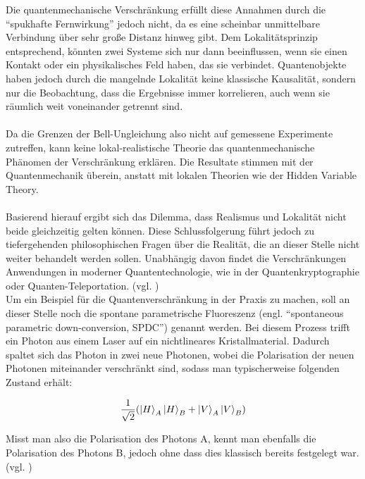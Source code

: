 Die quantenmechanische Verschränkung erfüllt diese Annahmen durch die ``spukhafte Fernwirkung'' jedoch nicht, da es eine scheinbar unmittelbare Verbindung über sehr große Distanz hinweg gibt. Dem Lokalitätsprinzip entsprechend, könnten zwei Systeme sich nur dann beeinflussen, wenn sie einen Kontakt oder ein physikalisches Feld haben, das sie verbindet. Quantenobjekte haben jedoch durch die mangelnde Lokalität keine klassische Kausalität, sondern nur die Beobachtung, dass die Ergebnisse immer korrelieren, auch wenn sie räumlich weit voneinander getrennt sind.
\\ \\
Da die Grenzen der Bell-Ungleichung also nicht auf gemessene Experimente zutreffen, kann keine lokal-realistische Theorie das quantenmechanische Phänomen der Verschränkung erklären. Die Resultate stimmen mit der Quantenmechanik überein, anstatt mit lokalen Theorien wie der Hidden Variable Theory. 
\\ \\
Basierend hierauf ergibt sich das Dilemma, dass Realismus und Lokalität nicht beide gleichzeitig gelten können. Diese Schlussfolgerung führt jedoch zu tiefergehenden philosophischen Fragen über die Realität, die an dieser Stelle nicht weiter behandelt werden sollen. Unabhängig davon findet die Verschränkungen Anwendungen in moderner Quantentechnologie, wie in der Quantenkryptographie oder Quanten-Teleportation.  
(vgl. \cite[Ch. 2.11]{homeister_quantum_2022-1})
\\

Um ein Beispiel für die Quantenverschränkung in der Praxis zu machen, soll an dieser Stelle noch  die spontane parametrische Fluoreszenz (engl. ``spontaneous parametric down-conversion, SPDC'') genannt werden. Bei diesem Prozess trifft ein Photon aus einem Laser auf ein nichtlineares Kristallmaterial. Dadurch spaltet sich das Photon in zwei neue Photonen, wobei die Polarisation der neuen Photonen miteinander verschränkt sind, sodass man typischerweise folgenden Zustand erhält:

\[
\frac{1}{\sqrt{2}}  ( \ket{H}_A \ket{H}_B + \ket{V}_A \ket{V}_B )
\]

Misst man also die Polarisation des Photons A, kennt man ebenfalls die Polarisation des Photons B, jedoch ohne dass dies klassisch bereits festgelegt war.
(vgl. \cite[Ch. 7]{hughes_quantum_2021})

